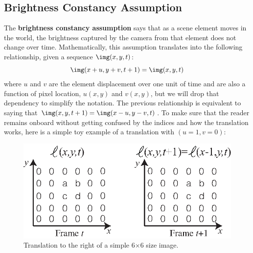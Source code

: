




\subsection{Brightness Constancy Assumption}

The {\bf brightness constancy assumption}  says that as a scene element moves in the world, the brightness captured by the camera from that element does not change over time. Mathematically, this assumption translates into the following relationship, given a sequence $\img (x,y,t)$:
\begin{equation}
    \img (x +u, y+v, t + 1)  = \img (x,y,t)
    \label{eq:constancy_brightness_assumption}
\end{equation}
where $u$ and $v$ are the element displacement over one unit of time and are also a function of pixel location, $u(x,y)$ and $v(x,y)$, but we will drop that dependency to simplify the notation. The previous relationship is equivalent to saying that $\img (x, y, t + 1) = \img (x-u,y-v,t)$. To make sure that the reader remains onboard without getting confused by the indices and how the translation works, here is a simple toy example of a translation with $(u=1, v=0)$:

\begin{figure}[h!]
    \centerline{
        \includegraphics[width=.5\linewidth]{figures/optical_flow/toy_motion_figure.eps}}
    \caption{Translation to the right of a simple 6$\times$6 size image.}
\end{figure}
\vspace{-0.2in}


